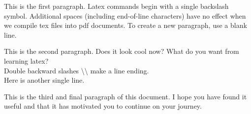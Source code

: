 \documentclass[12pt, a4paper]{article}
\begin{document}
This is the first paragraph.
Latex commands begin with a single backslash symbol.
Additional spaces (including end-of-line characters) have
no
effect
when we compile tex files into pdf documents.
To create a new paragraph, use a blank line.

This is the second paragraph. Does it look cool now? What do you want from learning latex?\\
Double backward slashes \textbackslash\textbackslash{} make a line ending.\\
Here is another single line.

This is the third and final paragraph of this document.
I hope you have found it useful and that it has motivated you to continue on your journey.

\end{document}

